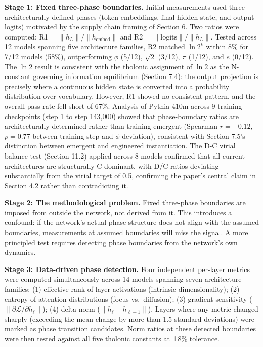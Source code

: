 \documentclass[
  11pt,
  letterpaper,
]{article}
\begin{document}
\textbf{Stage 1: Fixed three-phase boundaries.} Initial measurements
used three architecturally-defined phases (token embeddings, final
hidden state, and output logits) motivated by the supply chain framing
of Section 6. Two ratios were computed: R1 =
\(\|h_L\|/\|h_{\text{embed}}\|\) and R2 = \(\|\text{logits}\|/\|h_L\|\).
Tested across 12 models spanning five architecture families, R2 matched
\(\ln 2^k\) within 8\% for 7/12 models (58\%), outperforming \(\phi\)
(5/12), \(\sqrt{2}\) (3/12), \(\pi\) (1/12), and \(e\) (0/12). The
\(\ln 2\) result is consistent with the tholonic assignment of \(\ln 2\)
as the N-constant governing information equilibrium (Section 7.4): the
output projection is precisely where a continuous hidden state is
converted into a probability distribution over vocabulary. However, R1
showed no consistent pattern, and the overall pass rate fell short of
67\%. Analysis of Pythia-410m across 9 training checkpoints (step 1 to
step 143,000) showed that phase-boundary ratios are architecturally
determined rather than training-emergent (Spearman \(r = -0.12\),
\(p = 0.77\) between training step and \(\phi\)-deviation), consistent
with Section 7.5's distinction between emergent and engineered
instantiation. The D-C virial balance test (Section 11.2) applied across
8 models confirmed that all current architectures are structurally
C-dominant, with D/C ratios deviating substantially from the virial
target of 0.5, confirming the paper's central claim in Section 4.2
rather than contradicting it.

\textbf{Stage 2: The methodological problem.} Fixed three-phase
boundaries are imposed from outside the network, not derived from it.
This introduces a confound: if the network's actual phase structure does
not align with the assumed boundaries, measurements at assumed
boundaries will miss the signal. A more principled test requires
detecting phase boundaries from the network's own dynamics.

\textbf{Stage 3: Data-driven phase detection.} Four independent
per-layer metrics were computed simultaneously across 14 models spanning
seven architecture families: (1) effective rank of layer activations
(intrinsic dimensionality); (2) entropy of attention distributions
(focus vs.~diffusion); (3) gradient sensitivity
(\(\|\partial \mathcal{L}/\partial h_\ell\|\)); (4) delta norm
(\(\|h_\ell - h_{\ell-1}\|\)). Layers where any metric changed sharply
(exceeding the mean change by more than 1.5 standard deviations) were
marked as phase transition candidates. Norm ratios at these detected
boundaries were then tested against all five tholonic constants at ±8\%
tolerance.
\end{document}
